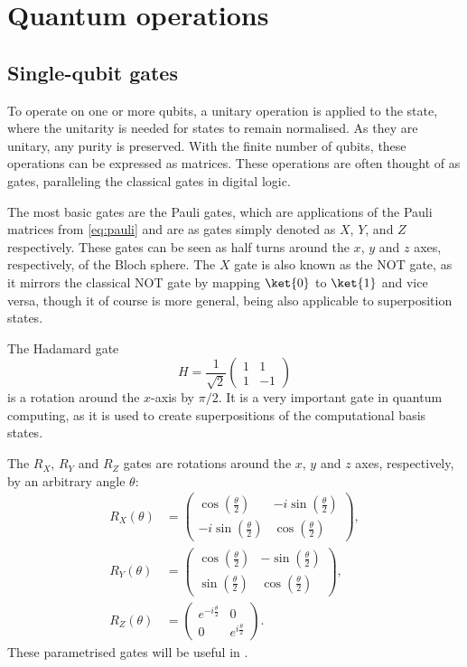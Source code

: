 \section{Quantum operations}
\subsection{Single-qubit gates}
To operate on one or more qubits, a unitary operation is applied to the state, where the unitarity is needed for states to remain normalised.
As they are unitary, any purity is preserved.
With the finite number of qubits, these operations can be expressed as matrices.
These operations are often thought of as gates, paralleling the classical gates in digital logic.


The most basic gates are the Pauli gates, which are applications of the Pauli matrices from \cref{eq:pauli} and are as gates simply denoted as $X$, $Y$, and $Z$ respectively.
These gates can be seen as half turns around the $x$, $y$ and $z$ axes, respectively, of the Bloch sphere.
The $X$ gate is also known as the NOT gate, as it mirrors the classical NOT gate by mapping $\ket{0}$ to $\ket{1}$ and vice versa, though it of course is more general, being also applicable to superposition states.

The Hadamard gate
\begin{equation}
    H = \frac{1}{\sqrt{2}} \begin{pmatrix} 1 & 1 \\ 1 & -1 \end{pmatrix}
\end{equation}
is a rotation around the $x$-axis by $\pi/2$.
It is a very important gate in quantum computing, as it is used to create superpositions of the computational basis states.


The $R_X$, $R_Y$ and $R_Z$ gates are rotations around the $x$, $y$ and $z$ axes, respectively, by an arbitrary angle $\theta$:
\begin{align*}
    R_X(\theta) & = \begin{pmatrix} \cos\left(\frac{\theta}{2}\right) & -i \sin\left(\frac{\theta}{2}\right) \\ -i \sin\left(\frac{\theta}{2}\right) & \cos\left(\frac{\theta}{2}\right) \end{pmatrix}, \\
    R_Y(\theta) & = \begin{pmatrix} \cos\left(\frac{\theta}{2}\right) & -\sin\left(\frac{\theta}{2}\right) \\ \sin\left(\frac{\theta}{2}\right) & \cos\left(\frac{\theta}{2}\right) \end{pmatrix},      \\
    R_Z(\theta) & = \begin{pmatrix} e^{-i\frac{\theta}{2}} & 0 \\ 0 & e^{i\frac{\theta}{2}} \end{pmatrix}.
\end{align*}
These parametrised gates will be useful in .

